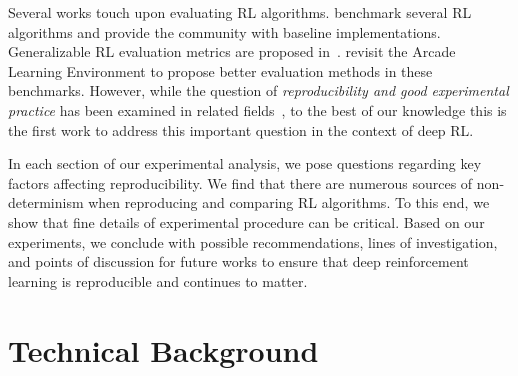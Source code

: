 \documentclass[letterpaper]{article} %
\begin{document}
Several works touch upon evaluating RL algorithms. \citeauthor{rllab}  benchmark several RL algorithms and provide the community with baseline implementations. Generalizable RL evaluation metrics are proposed in~\cite{environment_overfitting}. \citeauthor{machado2017revisiting}  revisit the Arcade Learning Environment to propose better evaluation methods in these benchmarks. However, while the question of \emph{reproducibility and good experimental practice} has been examined in related fields~\cite{wagstaff2012machine,boulesteix2013plea,stodden2014implementing,bouckaert2004evaluating,bouckaert2004estimating,vaughan}, to the best of our knowledge this is the first work to address this important question in the context of deep RL.

In each section of our experimental analysis, we pose questions regarding key factors affecting reproducibility. We find that there are numerous sources of non-determinism when reproducing and comparing RL algorithms. To this end, we show that fine details of experimental procedure can be critical. Based on our experiments, we conclude with possible recommendations, lines of investigation, and points of discussion for future works to ensure that deep reinforcement learning is reproducible and continues to matter.

\section{Technical Background}
\label{sec:background}
\end{document}
